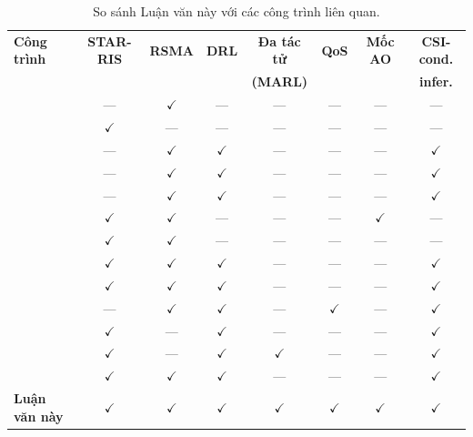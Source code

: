 \begin{table}[t]
\centering
\small
\caption{So sánh Luận văn này với các công trình liên quan.}
\label{tab:related_work}
\setlength{\tabcolsep}{4pt}
\begin{tabular}{lccccccc}
\toprule
\textbf{Công trình} & \textbf{STAR-RIS} & \textbf{RSMA} & \textbf{DRL} & \textbf{Đa tác tử} & \textbf{QoS} & \textbf{Mốc AO} & \textbf{CSI-cond.} \\
                    &                   &                &              & \textbf{(MARL)}     &              &              & \textbf{infer.}  \\
\midrule
\cite{mao2022rsma}        & --- & $\checkmark$ & ---           & ---           & ---           & ---           & ---           \\
\cite{liu2021starris}     & $\checkmark$ & --- & ---           & ---           & ---           & ---           & ---           \\
\cite{hieu2021optimal}    & --- & $\checkmark$ & $\checkmark$ & ---           & ---           & ---           & $\checkmark$ \\
\cite{hua2023learning}    & --- & $\checkmark$ & $\checkmark$ & ---           & ---           & ---           & $\checkmark$ \\
\cite{wu2024deep}         & --- & $\checkmark$ & $\checkmark$ & ---           & ---           & ---           & $\checkmark$ \\
\cite{soleymani2024starris}& $\checkmark$ & $\checkmark$ & --- & ---  & ---           & $\checkmark$ & ---           \\
\cite{gomes2024performance}& $\checkmark$ & $\checkmark$ & --- & ---  & ---           & ---           & ---           \\
\cite{amiri2024meta}      & $\checkmark$ & $\checkmark$ & $\checkmark$ & ---           & ---           & ---           & $\checkmark$ \\
\cite{bao2025heuristic}   & $\checkmark$ & $\checkmark$ & $\checkmark$ & ---           & ---           & ---           & $\checkmark$ \\
\cite{diamanti2023energy} & --- & $\checkmark$ & $\checkmark$ & ---           & $\checkmark$ & ---           & $\checkmark$ \\
\cite{huang2024starrisuav}& $\checkmark$ & --- & $\checkmark$ & ---           & ---           & ---           & $\checkmark$ \\
\cite{dange2026collaborative}& $\checkmark$ & --- & $\checkmark$ & $\checkmark$ & ---           & ---           & $\checkmark$ \\
\cite{faramarzi2024meta}  & $\checkmark$ & $\checkmark$ & $\checkmark$ & ---           & ---           & ---           & $\checkmark$ \\
\midrule
\textbf{Luận văn này}     & $\checkmark$ & $\checkmark$ & $\checkmark$ & $\checkmark$ & $\checkmark$ & $\checkmark$ & $\checkmark$ \\
\bottomrule
\end{tabular}


\end{table}
